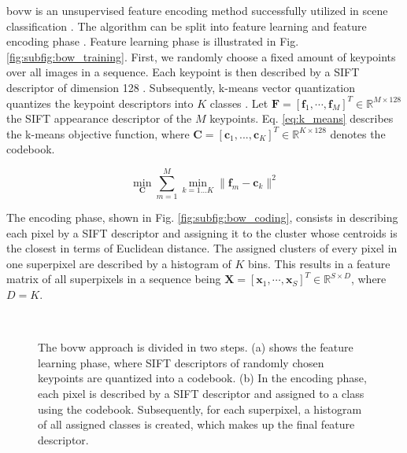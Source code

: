 \gls{bovw} is an unsupervised feature encoding method successfully utilized in scene classification \cite{zhang15}.
The algorithm can be split into feature learning and feature encoding phase \cite{cheriyadat14}.
Feature learning phase is illustrated in Fig. \ref{fig:subfig:bow_training}.
First, we randomly choose a fixed amount of keypoints over all images in a sequence.
Each keypoint is then described by a SIFT descriptor of dimension 128 \cite{lowe04}.
Subsequently, k-means vector quantization quantizes the keypoint descriptors into $K$ classes \cite{lloyed1982}.
Let $\boldsymbol{F} = [\boldsymbol{f}_1,\cdots,\boldsymbol{f}_M]^T \in \mathbb{R}^{M \times 128}$ the SIFT appearance descriptor of the $M$ keypoints.
Eq. \ref{eq:k_means} describes the k-means objective function, where $\boldsymbol{C} = [\boldsymbol{c}_1,...,\boldsymbol{c}_K]^T \in \mathbb{R}^{K \times 128}$ denotes the codebook.

\begin{equation}
   \min_{\boldsymbol{C}} \sum_{m=1}^M \min_{k=1...K} \|\boldsymbol{f}_m - \boldsymbol{c}_k\|^2
   \label{eq:k_means} 
\end{equation}
\vspace{6pt}

The encoding phase, shown in Fig. \ref{fig:subfig:bow_coding}, consists in describing each pixel by a SIFT descriptor and assigning it to the cluster whose centroids is the closest in terms of Euclidean distance.
The assigned clusters of every pixel in one superpixel are described by a histogram of $K$ bins.
This results in a feature matrix of all superpixels in a sequence being $\boldsymbol{X} = [\boldsymbol{x}_1,\cdots,\boldsymbol{x}_S]^T \in \mathbb{R}^{S \times D}$, where $D = K$.

\begin{figure}[htbp]
  \centering
  \\
  \caption[BoVW illustration]{The \gls{bovw} approach is divided in two steps.
    (a) shows the feature learning phase, where SIFT descriptors of randomly chosen keypoints are quantized into a codebook.
    (b) In the encoding phase, each pixel is described by a SIFT descriptor and assigned to a class using the codebook.
    Subsequently, for each superpixel, a histogram of all assigned classes is created, which makes up the final feature descriptor.}
  \label{fig:BoVW_approch}  
\end{figure}


